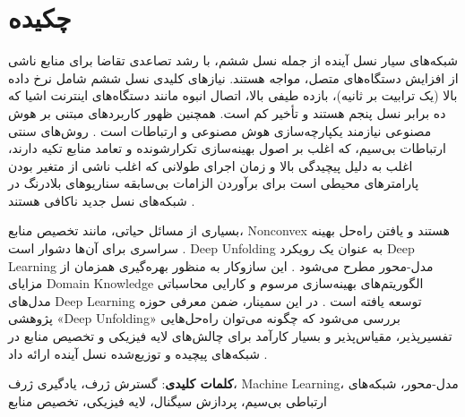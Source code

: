 \clearpage
\section*{چکیده}
شبکه‌های سیار نسل آینده از جمله نسل ششم، با رشد تصاعدی تقاضا برای منابع ناشی از افزایش دستگاه‌های متصل، مواجه هستند. نیازهای کلیدی نسل ششم شامل نرخ داده بالا (یک ترابیت بر ثانیه)، بازده طیفی بالا، اتصال انبوه مانند دستگاه‌های اینترنت اشیا که ده برابر نسل پنجم هستند و تأخیر کم است. همچنین ظهور کاربردهای مبتنی بر هوش مصنوعی نیازمند یکپارچه‌سازی هوش مصنوعی و ارتباطات است 
\cite{ComprehensiveReview, SignalProcessing}.
روش‌های سنتی ارتباطات بی‌سیم، که اغلب بر اصول بهینه‌سازی تکرارشونده و تعامد منابع تکیه دارند، اغلب به دلیل پیچیدگی بالا و زمان اجرای طولانی که اغلب ناشی از متغیر بودن پارامترهای محیطی است برای برآوردن الزامات بی‌سابقه سناریوهای بلادرنگ در شبکه‌های نسل جدید ناکافی هستند 
\cite{ComprehensiveReview, SignalProcessing}. 

بسیاری از مسائل حیاتی، مانند تخصیص منابع، 
\gls*{Nonconvex}
  هستند و یافتن راه‌حل بهینه سراسری برای آن‌ها دشوار است 
\cite{OptimizingWireless, NeuralSumRate, OpenRANet, UnfoldingWMMSE}.
\gls*{Deep Unfolding}
  به عنوان یک رویکرد
\gls*{Deep Learning}
   مدل-محور  مطرح می‌شود 
\cite{ComprehensiveReview}.
 این سازوکار به منظور بهره‌گیری همزمان از مزایای 
\gls*{Domain Knowledge}
  الگوریتم‌های بهینه‌سازی مرسوم و کارایی محاسباتی مدل‌های 
\gls*{Deep Learning}
   توسعه یافته است 
\cite{ComprehensiveReview, SignalProcessing, UnfoldingWMMSE}. 
در این سمینار، ضمن معرفی حوزه پژوهشی
 «\gls*{Deep Unfolding}»
 بررسی می‌شود که چگونه می‌توان راه‌حل‌هایی تفسیرپذیر، مقیاس‌پذیر و بسیار کارآمد برای چالش‌های لایه فیزیکی و تخصیص منابع در شبکه‌های پیچیده و توزیع‌شده نسل آینده ارائه داد 
\cite{ComprehensiveReview, UnfoldingWMMSE}.

\vskip 5mm
\noindent\textbf{کلمات کلیدی}: 
گسترش ژرف، یادگیری ژرف،
\gls*{Machine Learning}،
مدل-محور، شبکه‌های ارتباطی بی‌سیم، پردازش سیگنال، لایه فیزیکی، تخصیص منابع